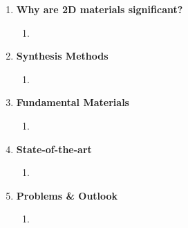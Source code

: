 \documentclass{article}
\begin{document}
\begin{enumerate}
\begin{enumerate}
			\item{}
		\end{enumerate} %
	\item{\textbf{Why are 2D materials significant?}}
		\begin{enumerate} %
			\item{}
		\end{enumerate} %
	\item{\textbf{Synthesis Methods}}
		\begin{enumerate} %
			\item{}
		\end{enumerate} %
	\item{\textbf{Fundamental Materials}} 
		\begin{enumerate}	%
			\item{}
		\end{enumerate} %
	\item{\textbf{State-of-the-art}}
		\begin{enumerate} %
			\item{}
		\end{enumerate}	%
	\item{\textbf{Problems \& Outlook}}
		\begin{enumerate}	%
			\item{}
		\end{enumerate} %
\end{enumerate} %



\end{document}
